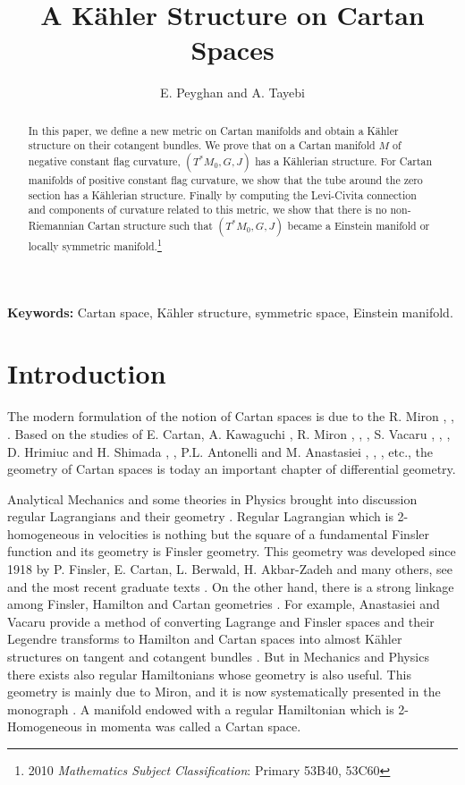 \documentclass[10pt,a4paper]{article}
\theoremstyle{plain}
\theoremstyle{definition}
\begin{document}
\title{A K\"{a}hler Structure on Cartan Spaces}
\author{E. Peyghan and A. Tayebi}

\maketitle
\begin{abstract}
In this paper, we define a new metric on  Cartan manifolds  and
obtain a K\"{a}hler structure on their cotangent bundles. We prove that on a Cartan manifold $M$ of negative
constant flag curvature, $(T^{\ast}M_0,G,J)$ has  a K\"{a}hlerian structure. For Cartan manifolds of positive constant flag curvature, we show that the tube around the zero section has a K\"{a}hlerian structure. Finally by computing the Levi-Civita connection and components of curvature related to this metric, we show that
there is no non-Riemannian Cartan structure such that
$(T^{\ast}M_0, G, J)$ became a Einstein manifold or locally
symmetric manifold.\footnote{2010 {\it Mathematics Subject
Classification}: Primary 53B40, 53C60}
\end{abstract}

\textbf{Keywords:} Cartan space, K\"{a}hler structure, symmetric
space, Einstein manifold.



\section{Introduction}
The modern formulation of the notion of Cartan spaces is due to 
the R. Miron \cite{Mir1}, \cite{Mir2}, \cite{Mir3}.
 Based on the studies of E. Cartan, A. Kawaguchi \cite{Kaw}, R.
Miron \cite{MirHri}, \cite{Mir2}, \cite{Mir3}, S. Vacaru \cite{V1}, \cite{V2}, \cite{V3},  D. Hrimiuc and
H. Shimada \cite{Hri}, \cite{HriShi},
 P.L. Antonelli and  M. Anastasiei  \cite{Anas}, \cite{MirAn}, \cite{M2}, etc.,
 the geometry of Cartan spaces is today an important chapter of differential geometry.



Analytical Mechanics and some theories in Physics brought into
discussion regular Lagrangians and their geometry \cite{MirAn}.
 Regular Lagrangian which is 2-homogeneous in velocities is nothing but the
square of a fundamental Finsler function and its geometry is
Finsler geometry. This geometry was developed since 1918 by P.
Finsler, E. Cartan, L. Berwald, H. Akbar-Zadeh and many others, see \cite{Matsu}
and the most recent graduate texts  \cite{AZ}\cite{BCS}\cite{ShDiff}\cite{ShLec}. On the other hand, there is a strong linkage among  Finsler, Hamilton and Cartan geometries \cite{PT2}. For example,  Anastasiei and Vacaru provide a method of converting Lagrange and Finsler spaces and their Legendre transforms to Hamilton and Cartan spaces into almost K\"{a}hler structures on tangent and cotangent bundles \cite{AV}. But in Mechanics
and Physics there exists also regular Hamiltonians whose geometry
is also useful. This geometry is mainly due to Miron, and it is now systematically presented in the
monograph \cite{MirHri}. A manifold endowed with a regular
Hamiltonian which is 2-Homogeneous in momenta was called a Cartan space.
\end{document}
